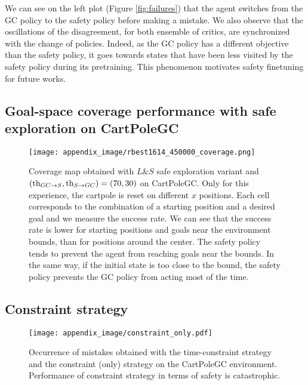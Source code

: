 We can see on the left plot (Figure \ref{fig:failures}) that the agent switches from the GC policy to the safety policy before making a 
mistake. 
We also observe that the oscillations of the disagreement, for both ensemble of critics,
are synchronized with the change of policies. Indeed, as the GC policy has a different objective
than the safety policy, it goes towards states that have been less visited by the safety policy during 
its pretraining. This phenomenon motivates safety finetuning for future works. 

  

\newpage

\subsection{Goal-space coverage performance with safe exploration on CartPoleGC}

\begin{figure}[ht]
  \texttt{[image: appendix\_image/rbest1614\_450000\_coverage.png]}
  \caption{Coverage map obtained with $L\&S$ safe exploration variant and $(\text{th}_{GC \rightarrow S}, \text{th}_{S \rightarrow GC}) = (70, 30)$
  on CartPoleGC. Only for this experience, the cartpole is reset on different $x$ positions. 
  Each cell corresponds to the combination of a starting position and a desired goal and we measure the 
  success rate. We can see that the success rate is lower for starting positions and goals near the 
  environment bounds, than for positions around the center. 
  The safety policy tends to prevent the agent from reaching goals near the bounds.
  In the same way, if the initial state is too close to the bound, the safety policy prevents the 
  GC policy from acting most of the time.}
  \label{fig:cartpole_cov}
\end{figure}


\subsection{Constraint strategy}

\begin{figure}[ht]
\texttt{[image: appendix\_image/constraint\_only.pdf]}
\caption{Occurrence of mistakes obtained with the time-constraint strategy and the constraint (only) strategy 
on the CartPoleGC environment. Performance of constraint strategy in terms of safety is catastrophic.}
\label{fig:constraint_only}
\end{figure}

